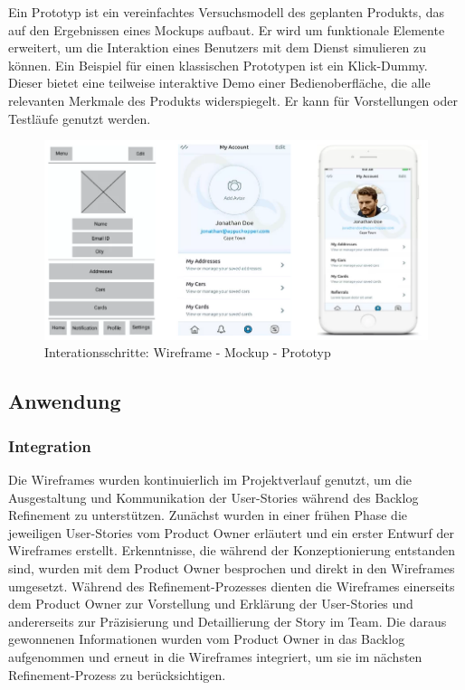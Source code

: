 
Ein Prototyp ist ein vereinfachtes Versuchsmodell des geplanten Produkts, das auf den Ergebnissen eines Mockups aufbaut. Er wird um funktionale Elemente erweitert, um die Interaktion eines Benutzers mit dem Dienst simulieren zu können.
Ein Beispiel für einen klassischen Prototypen ist ein Klick-Dummy. Dieser bietet eine teilweise interaktive Demo einer Bedienoberfläche, die alle relevanten Merkmale des Produkts widerspiegelt. Er kann für Vorstellungen oder Testläufe genutzt werden.


\begin{figure}[!htb]
    \centering
    \includegraphics[scale=2]{figures/jan/Wire_Fixes-Wire-prototyp.png}
    \caption[Interationsschritte an einem Beispiel: Wireframe - Mockup - Prototyp]{Interationsschritte: Wireframe - Mockup - Prototyp}
    \label{fig:image}
\end{figure}

\subsection{Anwendung}
\subsubsection{Integration}

Die Wireframes wurden kontinuierlich im Projektverlauf genutzt, um die Ausgestaltung und Kommunikation der User-Stories während des Backlog Refinement zu unterstützen. Zunächst wurden in einer frühen Phase die jeweiligen User-Stories vom Product Owner erläutert und ein erster Entwurf der Wireframes erstellt. Erkenntnisse, die während der Konzeptionierung entstanden sind, wurden mit dem Product Owner besprochen und direkt in den Wireframes umgesetzt.
Während des Refinement-Prozesses dienten die Wireframes einerseits dem Product Owner zur Vorstellung und Erklärung der User-Stories und andererseits zur Präzisierung und Detaillierung der Story im Team. Die daraus gewonnenen Informationen wurden vom Product Owner in das Backlog aufgenommen und erneut in die Wireframes integriert, um sie im nächsten Refinement-Prozess zu berücksichtigen.

